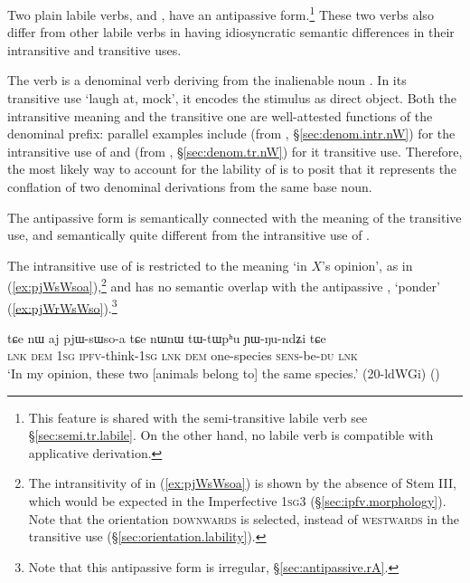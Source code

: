 Two plain labile verbs,   and  , have an antipassive form.\footnote{This feature is shared with the semi-transitive labile verb  see §\ref{sec:semi.tr.labile}. On the other hand, no labile verb is compatible with applicative derivation. } These two verbs also differ from other labile verbs in having idiosyncratic semantic differences in their intransitive and transitive uses. 


The verb  is a denominal verb deriving from the inalienable noun . In its transitive use  `laugh at, mock', it encodes the stimulus as direct object. Both the intransitive meaning and the transitive one are well-attested functions of the  denominal prefix: parallel examples include  (from , §\ref{sec:denom.intr.nW}) for the intransitive use of  and  (from , §\ref{sec:denom.tr.nW}) for it transitive use. Therefore, the most likely way to account for the lability of  is to posit that it represents the conflation of two denominal derivations from the same base noun.

The antipassive form  is semantically connected with the meaning of the transitive use, and semantically quite different from the intransitive use of  .

The intransitive use of  is restricted to the meaning `in $X$'s opinion', as in (\ref{ex:pjWsWsoa}),\footnote{The intransitivity of  in (\ref{ex:pjWsWsoa}) is shown by the absence of Stem III, which would be expected in the Imperfective \textsc{1sg}\fl{}3 (§\ref{sec:ipfv.morphology}). Note that the orientation \textsc{downwards} is selected, instead of \textsc{westwards} in the transitive use (§\ref{sec:orientation.lability}). } and has no semantic overlap with the antipassive , `ponder' (\ref{ex:pjWrWsWso}).\footnote{Note that this antipassive form is irregular, §\ref{sec:antipassive.rA}.}  

\begin{exe}
\ex \label{ex:pjWsWsoa}
\gll  tɕe nɯ aj pjɯ-sɯso-a tɕe nɯnɯ tɯ-tɯpʰu ɲɯ-ŋu-ndʑi tɕe \\
\textsc{lnk} \textsc{dem} \textsc{1sg} \textsc{ipfv}-think-\textsc{1sg} \textsc{lnk} \textsc{dem} one-species \textsc{sens}-be-\textsc{du} \textsc{lnk} \\
\glt  `In my opinion, these two [animals belong to] the same species.' (20-ldWGi)
()
\end{exe}

